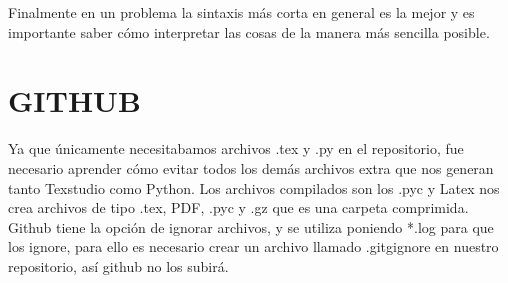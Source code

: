 \documentclass{article}
\begin{document}
Finalmente en un problema la sintaxis más corta en general es la mejor y es importante saber cómo interpretar las cosas de la manera más sencilla posible.

\section{GITHUB}
Ya que únicamente necesitabamos archivos .tex y .py en el repositorio, fue necesario aprender cómo evitar todos los demás archivos extra que nos generan tanto Texstudio como Python. Los archivos compilados son los .pyc y Latex nos crea archivos de tipo .tex, PDF, .pyc y .gz  que es una carpeta comprimida. \\
Github tiene la opción de ignorar archivos, y se utiliza poniendo *.log para que los ignore, para ello es necesario crear un archivo llamado .gitgignore en nuestro repositorio, así github no los subirá.
\end{document}
